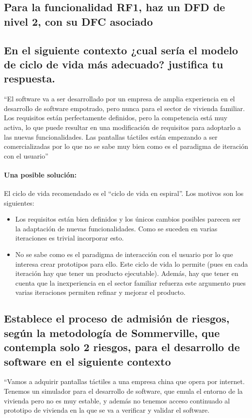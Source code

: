 \subsection{Para la funcionalidad RF1, haz un DFD de nivel 2, con su DFC asociado}


\subsection{En el siguiente contexto ¿cual sería el modelo de ciclo de vida más adecuado? justifica tu respuesta.}
``El software va a ser desarrollado por un empresa de amplia experiencia en el desarrollo de software empotrado, pero nunca para el sector de vivienda familiar. Los requisitos están perfectamente definidos, pero la competencia está muy activa, lo que puede resultar en una modificación de requisitos para adoptarlo a las nuevas funcionalidades. Las pantallas táctiles están empezando a ser comercializadas por lo que no se sabe muy bien como es el paradigma de iteración con el usuario''

\paragraph{Una posible solución:} El ciclo de vida recomendado es el ``ciclo de vida en espiral''. Los motivos son los siguientes:
\begin{itemize}
    \item Los requisitos están bien definidos y los únicos cambios posibles parecen ser la adaptación de nuevas funcionalidades. Como se suceden en varias iteraciones es trivial incorporar esto.
    \item No se sabe como es el paradigma de interacción con el usuario por lo que interesa crear prototipos para ello. Este ciclo de vida lo permite (pues en cada iteración hay que tener un producto ejecutable). Además, hay que tener en cuenta que la inexperiencia en el sector familiar refuerza este argumento pues varias iteraciones permiten refinar y mejorar el producto.
\end{itemize}

\subsection{Establece el proceso de admisión de riesgos, según la metodología de Sommerville, que contempla solo 2 riesgos, para el desarrollo de software en el siguiente contexto}
``Vamos a adquirir pantallas táctiles a una empresa china que opera por internet. Tenemos un simulador para el desarrollo de software, que emula el entorno de la vivienda pero no es muy estable, y además no tenemos acceso continuado al prototipo de vivienda en la que se va a verificar y validar el software.

